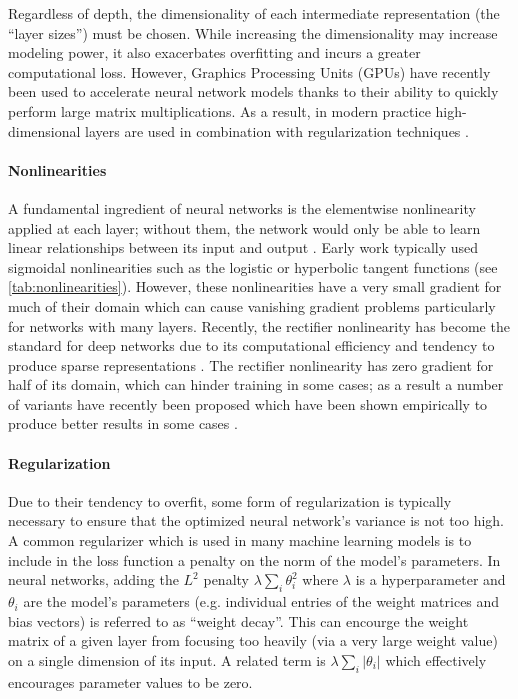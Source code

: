 Regardless of depth, the dimensionality of each intermediate representation (the ``layer sizes'') must be chosen.
While increasing the dimensionality may increase modeling power, it also exacerbates overfitting and incurs a greater computational loss.
However, Graphics Processing Units (GPUs) have recently been used to accelerate neural network models thanks to their ability to quickly perform large matrix multiplications.
As a result, in modern practice high-dimensional layers are used in combination with regularization techniques \cite{}.

\paragraph{Nonlinearities}

A fundamental ingredient of neural networks is the elementwise nonlinearity applied at each layer; without them, the network would only be able to learn linear relationships between its input and output \cite{}.
Early work typically used sigmoidal nonlinearities such as the logistic or hyperbolic tangent functions (see \cref{tab:nonlinearities}).
However, these nonlinearities have a very small gradient for much of their domain which can cause vanishing gradient problems particularly for networks with many layers.
Recently, the rectifier nonlinearity has become the standard for deep networks due to its computational efficiency and tendency to produce sparse representations \cite{}.
The rectifier nonlinearity has zero gradient for half of its domain, which can hinder training in some cases; as a result a number of variants have recently been proposed which have been shown empirically to produce better results in some cases \cite{}.

\paragraph{Regularization}

Due to their tendency to overfit, some form of regularization is typically necessary to ensure that the optimized neural network's variance is not too high.
A common regularizer which is used in many machine learning models is to include in the loss function a penalty on the norm of the model's parameters.
In neural networks, adding the $L^2$ penalty $\lambda \sum_i \theta_i^2$ where $\lambda$ is a hyperparameter and $\theta_i$ are the model's parameters (e.g. individual entries of the weight matrices and bias vectors) is referred to as ``weight decay''.
This can encourge the weight matrix of a given layer from focusing too heavily (via a very large weight value) on a single dimension of its input.
A related term is $\lambda \sum_i |\theta_i|$ which effectively encourages parameter values to be zero.

